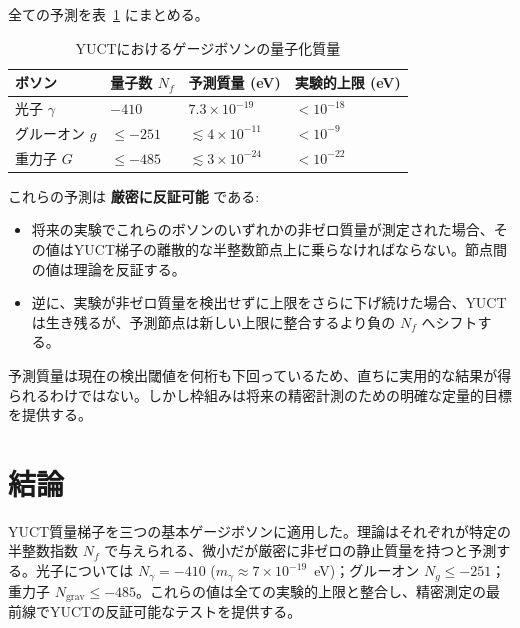 \documentclass[11pt,a4paper]{article}
\begin{document}
	全ての予測を表~\ref{tab:predictions} にまとめる。
	
	\begin{table}[H]
		\centering
		\footnotesize
		\caption{YUCTにおけるゲージボソンの量子化質量}
		\label{tab:predictions}
		\begin{tabular}{p{3cm}p{3cm}p{3cm}p{3cm}}
			\toprule
			\textbf{ボソン} & \textbf{量子数 $N_f$} & \textbf{予測質量 (eV)} & \textbf{実験的上限 (eV)} \\
			\midrule
			光子   $\gamma$ & $-410$ & $7.3 \times 10^{-19}$ & $< 10^{-18}$ \\
			グルーオン $g$ & $\le -251$ & $\lesssim 4 \times 10^{-11}$ & $< 10^{-9}$ \\
			重力子 $G$ & $\le -485$ & $\lesssim 3 \times 10^{-24}$ & $< 10^{-22}$ \\
			\bottomrule
		\end{tabular}
	\end{table}
	
	これらの予測は \textbf{厳密に反証可能} である:
	\begin{itemize}
		\item 将来の実験でこれらのボソンのいずれかの非ゼロ質量が測定された場合、その値はYUCT梯子の離散的な半整数節点上に乗らなければならない。節点間の値は理論を反証する。
		\item 逆に、実験が非ゼロ質量を検出せずに上限をさらに下げ続けた場合、YUCTは生き残るが、予測節点は新しい上限に整合するより負の $N_f$ へシフトする。
	\end{itemize}
	
	予測質量は現在の検出閾値を何桁も下回っているため、直ちに実用的な結果が得られるわけではない。しかし枠組みは将来の精密計測のための明確な定量的目標を提供する。
	
	\section{結論}
	
	YUCT質量梯子を三つの基本ゲージボソンに適用した。理論はそれぞれが特定の半整数指数 $N_f$ で与えられる、微小だが厳密に非ゼロの静止質量を持つと予測する。光子については $N_\gamma = -410$ ($m_\gamma \approx 7\times 10^{-19}$~eV)；グルーオン $N_g \le -251$；重力子 $N_{\mathrm{grav}} \le -485$。これらの値は全ての実験的上限と整合し、精密測定の最前線でYUCTの反証可能なテストを提供する。
	
\end{document}
